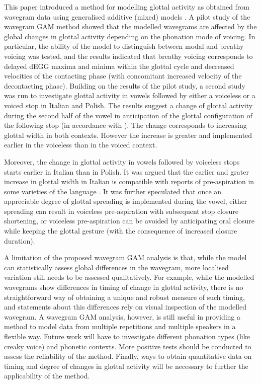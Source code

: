 \documentclass[
  11pt,
  a4paper,
]{article}
\begin{document}
This paper introduced a method for modelling glottal activity as
obtained from wavegram data \citep{herbst2010} using generalised
additive (mixed) models \citep{hastie1986, zuur2012, wood2017}. A pilot
study of the wavegram GAM method showed that the modelled wavegrams are
affected by the global changes in glottal activity depending on the
phonation mode of voicing. In particular, the ability of the model to
distinguish between modal and breathy voicing was tested, and the
results indicated that breathy voicing corresponds to delayed dEGG
maxima and minima within the glottal cycle and decreased velocities of
the contacting phase (with concomitant increased velocity of the
decontacting phase). Building on the results of the pilot study, a
second study was run to investigate glottal activity in vowels followed
by either a voiceless or a voiced stop in Italian and Polish. The
results suggest a change of glottal activity during the second half of
the vowel in anticipation of the glottal configuration of the following
stop (in accordance with \citealt{halle1967a}). The change corresponds
to increasing glottal width in both contexts. However the increase is
greater and implemented earlier in the voiceless than in the voiced
context.

Moreover, the change in glottal activity in vowels followed by voiceless
stops starts earlier in Italian than in Polish. It was argued that the
earlier and grater increase in glottal width in Italian is compatible
with reports of pre-aspiration in some varieties of the language
\citep{ni-chasaide1993, stevens2014a}. It was further speculated that
once an appreciable degree of glottal spreading is implemented during
the vowel, either spreading can result in voiceless pre-aspiration with
subsequent stop closure shortening, or voiceless pre-aspiration can be
avoided by anticipating oral closure while keeping the glottal gesture
(with the consequence of increased closure duration).

A limitation of the proposed wavegram GAM analysis is that, while the
model can statistically assess global differences in the wavegram, more
localised variation still needs to be assessed qualitatively. For
example, while the modelled wavegrams show differences in timing of
change in glottal activity, there is no straightforward way of obtaining
a unique and robust measure of such timing, and statements about this
differences rely on visual inspection of the modelled wavegram. A
wavegram GAM analysis, however, is still useful in providing a method to
model data from multiple repetitions and multiple speakers in a flexible
way. Future work will have to investigate different phonation types
(like creaky voice) and phonetic contexts. More positive tests should be
conducted to assess the reliability of the method. Finally, ways to
obtain quantitative data on timing and degree of changes in glottal
activity will be necessary to further the applicability of the method.

  
\end{document}
